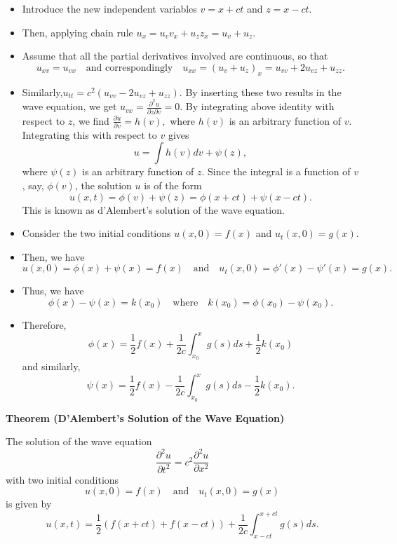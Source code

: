 \documentclass[12pt,openany]{book}
\theoremstyle{definition}
\begin{document}
	\begin{itemize}
		\item Introduce the new independent variables
		$v = x + ct$ and $z = x - ct.$
		\item Then, applying chain rule $
		u_x = u_v v_x + u_z z_x = u_v + u_z.$
		\item Assume that all the partial derivatives involved are continuous, so that
		\[
		u_{xv} = u_{vx} \quad \text{and correspondingly} \quad u_{xx} = (u_v + u_z)_x = u_{vv} + 2u_{vz} + u_{zz}.
		\]
		\item Similarly,$
		u_{tt} = c^2 (u_{vv} - 2u_{vz} + u_{zz}).$
	By inserting these two results in the wave equation, we get
	$
	u_{vx} = \frac{\partial^2 u}{\partial z \partial v} = 0.
	$
	By integrating above identity with respect to \( z \), we find
	$
	\frac{\partial u}{\partial v} = h(v),
	$
	where \( h(v) \) is an arbitrary function of \( v \). Integrating this with respect to \( v \) gives
	\[
	u = \int h(v) dv + \psi(z),
	\]
	where \( \psi(z) \) is an arbitrary function of \( z \). Since the integral is a function of \( v \), say, \( \phi(v) \), the solution \( u \) is of the form
	\[
	u(x, t) = \phi(v) + \psi(z) = \phi(x + ct) + \psi(x - ct).
	\]
	This is known as d'Alembert's solution of the wave equation.
		\item Consider the two initial conditions
		$
		u(x, 0) = f(x)$ and $u_t(x, 0) = g(x).
		$
		\item Then, we have
		\[
		u(x, 0) = \phi(x) + \psi(x) = f(x) \quad \text{and} \quad u_t(x, 0) = \phi'(x) - \psi'(x) = g(x).
		\]
		\item Thus, we have
		\[
		\phi(x) - \psi(x) = k(x_0) \quad \text{where} \quad k(x_0) = \phi(x_0) - \psi(x_0).
		\]
		\item Therefore,
		\[
		\phi(x) = \frac{1}{2} f(x) + \frac{1}{2c} \int_{x_0}^{x} g(s) ds + \frac{1}{2} k(x_0)
		\]
		and similarly,
		\[
		\psi(x) = \frac{1}{2} f(x) - \frac{1}{2c} \int_{x_0}^{x} g(s) ds - \frac{1}{2} k(x_0).
		\]
	\end{itemize}
	
	\textbf{Theorem (D'Alembert's Solution of the Wave Equation)}
	
	The solution of the wave equation
	\[
	\frac{\partial^2 u}{\partial t^2} = c^2 \frac{\partial^2 u}{\partial x^2}
	\]
	with two initial conditions
	\[
	u(x, 0) = f(x) \quad \text{and} \quad u_t(x, 0) = g(x)
	\]
	is given by
	\[
	u(x, t) = \frac{1}{2} (f(x + ct) + f(x - ct)) + \frac{1}{2c} \int_{x-ct}^{x+ct} g(s) ds.
	\]
	
\end{document}

